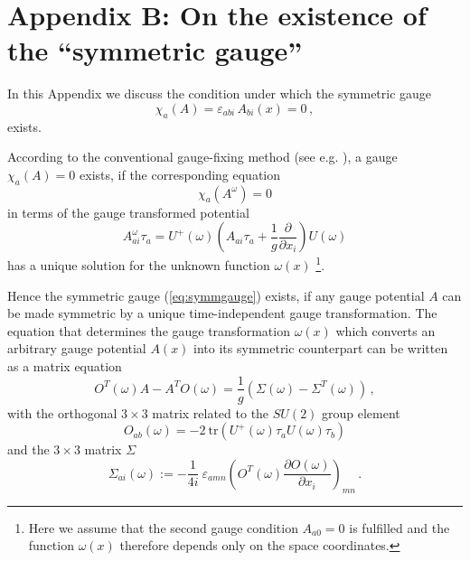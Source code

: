\documentclass[a4paper,12pt]{article}
\begin{document}

\section*{Appendix B: On the existence of the ``symmetric gauge'' }

\label{ap:B}

In this Appendix we discuss the condition under which the symmetric gauge
\begin{equation}
\label{eq:symmgauge}
\chi_a (A) = \varepsilon_{abi}\,A_{bi}(x) = 0\,,
\end{equation}
exists.

According to the conventional  gauge-fixing method
(see e.g. \cite{FadSlav}), a gauge $\chi_a (A) = 0$ exists,
if the corresponding equation
\begin{equation}
\label{eq:gf}
\chi_a (A^\omega) =0
\end{equation}
in terms of the gauge transformed potential
\begin{equation}
\label{eq:gtr}
A^\omega_{ai}\tau_a =
U^+ (\omega)
         \left( A_{ai}\tau_a
         + \frac{1}{g}\frac{\partial}{\partial x_i} \right)U(\omega)
\end{equation}
has a unique solution for the unknown function $\omega(x)$
\footnote{
Here we assume that the second gauge condition $A_{a0}=0$ is fulfilled and
the function $\omega(x)$ therefore depends only on the space coordinates.}.

Hence the symmetric gauge (\ref{eq:symmgauge}) exists, if any gauge potential
$A$ can be made symmetric by a unique time-independent gauge transformation.
The equation that determines the gauge transformation $\omega(x)$ which converts
an arbitrary gauge potential $A(x)$ into its symmetric counterpart
can be written as a matrix equation
\begin{equation}
\label{eq:symgeq}
O^T(\omega)A-A^TO(\omega) = \frac{1}{g}\left(\Sigma(\omega)
                           -\Sigma^T(\omega)\right)\,,
\end{equation}
with the orthogonal $3\times 3$ matrix related to the $SU(2)$ group element
\begin{equation}\label{eq:ort}
O_{ab}(\omega) =
- 2\ \mbox{tr} \left(U^+(\omega)\tau_a U(\omega)\tau_b\right)
\end{equation}
and the $3\times 3$ matrix $\Sigma$
\begin{equation}
\label{eq:Omega}
\Sigma_{ai}(\omega):= - \frac{1}{4 i}
\ \varepsilon_{amn}\left(O^T(\omega)
\frac{\partial O(\omega)}{\partial x_i}\right)_{mn}\,.
\end{equation}
\end{document}
